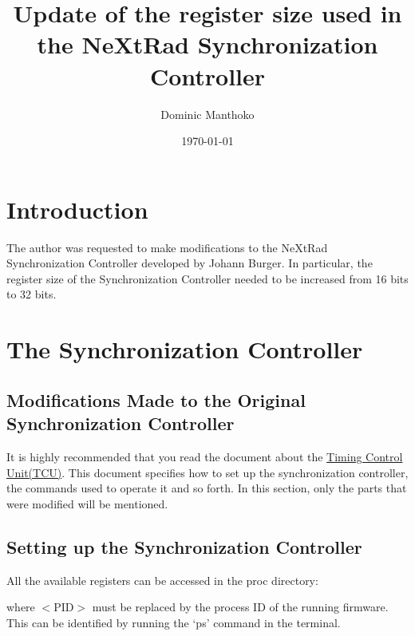 \documentclass[12pt, a4paper]{article}
\title{Update of the register size used in the NeXtRad Synchronization Controller}
\author{Dominic Manthoko}
\date{\today}
\begin{document}
\maketitle

\sloppy


\section{Introduction}

The author was requested to make modifications to the NeXtRad Synchronization Controller developed by Johann Burger. In particular, the register size of the Synchronization Controller needed to be increased from 16 bits to 32 bits. 


\section{The Synchronization Controller}
\subsection{Modifications Made to the Original Synchronization Controller}
It is highly recommended that you read the document about the \href{https://docs.google.com/document/d/1E-mxDRlNcjSsjckUj8SuQOPBRs8Zv4AUUxXzLDHU3zc/edit?usp=sharing}{Timing Control Unit(TCU)}. This document specifies how to set up the synchronization controller, the commands used to operate it and so forth. In this section, only the parts that were modified will be mentioned.


\subsection{Setting up the Synchronization Controller} \label{syn_control_setup}
All the available registers can be accessed in the proc directory:


where $<$PID$>$ must be replaced by the process ID of the running firmware. This can be identified by running the ‘ps’ command in the terminal.
\end{document}
